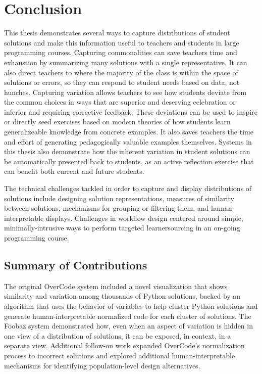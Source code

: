 \chapter{Conclusion}\label{chapter:conclusion}

This thesis demonstrates several ways to capture distributions of student solutions and make this information useful to teachers and students in large programming courses. Capturing commonalities can save teachers time and exhaustion by summarizing many solutions with a single representative. It can also direct teachers to where the majority of the class is within the space of solutions or errors, so they can respond to student needs based on data, not hunches. Capturing variation allows teachers to see how students deviate from the common choices in ways that are superior and deserving celebration or inferior and requiring corrective feedback. These deviations can be used to inspire or directly seed exercises based on modern theories of how students learn generalizeable knowledge from concrete examples. It also saves teachers the time and effort of generating pedagogically valuable examples themselves. Systems in this thesis also demonstrate how the inherent variation in student solutions can be automatically presented back to students, as an active reflection exercise that can benefit both current and future students. 

The technical challenges tackled in order to capture and display distributions of solutions include designing solution representations, measures of similarity between solutions, mechanisms for grouping or filtering them, and human-interpretable displays. Challenges in workflow design centered around simple, minimally-intrusive ways to perform targeted learnersourcing in an on-going programming course.

\section{Summary of Contributions}

The original OverCode system included a novel visualization that shows similarity and variation among thousands of Python solutions, backed by an algorithm that uses the behavior of variables to help cluster Python solutions and generate human-interpretable normalized code for each cluster of solutions. The Foobaz system demonstrated how, even when an aspect of variation is hidden in one view of a distribution of solutions, it can be exposed, in context, in a separate view. Additional follow-on work expanded OverCode's normalization process to incorrect solutions and explored additional human-interpretable mechanisms for identifying population-level design alternatives.

